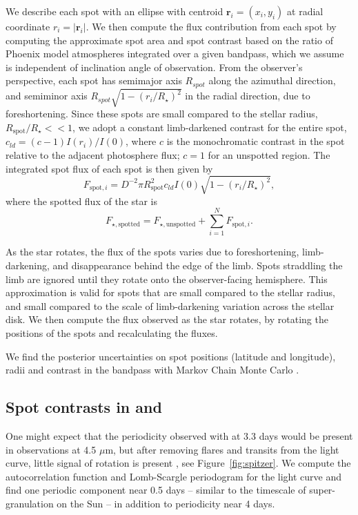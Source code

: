 We describe  each spot with an ellipse with centroid $\mathbf{r}_i = (x_i, y_i)$
at radial coordinate $r_i = \vert \mathbf{r}_i\vert$.  We
then compute the flux contribution from each spot by computing 
the approximate spot area and spot contrast based on the ratio of Phoenix 
model atmospheres integrated over a given bandpass, which we assume is 
independent of inclination angle of observation.  From the observer's 
perspective, each spot has semimajor axis $R_{spot}$ along the azimuthal
direction,  and semiminor axis $R_{spot} \sqrt{1 - (r_i /R_\star)^2}$ in 
the radial direction, due to foreshortening. Since these spots are
small compared to the stellar radius, $R_{\mathrm{spot}}/R_\star <<1$,  
we adopt a constant limb-darkened contrast for the entire spot,
$c_{ld} = (c-1) I(r_i)/I(0)$, where $c$ is the monochromatic contrast 
in the spot relative to the adjacent photosphere flux;  $c=1$ for an
unspotted region. The integrated  spot flux of each spot is then given by
\begin{equation}
F_{\mathrm{spot}, i} = D^{-2} \pi R_{\mathrm{spot}}^2 c_{ld} I(0) \sqrt{1 - (r_i/R_\star)^2}, 
\end{equation}
where the spotted flux of the star is
\begin{equation}
F_{\star, \mathrm{spotted}} = F_{\star, \mathrm{unspotted}}  + \sum_{i=1}^{N} F_{\mathrm{spot}, i}.
\end{equation}

As the star rotates, the flux of the spots varies due to foreshortening,
limb-darkening, and disappearance behind the edge of the limb. Spots
straddling the limb are ignored until they rotate onto the observer-facing 
hemisphere. This approximation is valid 
for spots that are small compared to the stellar radius, and small compared 
to the scale of limb-darkening variation across the stellar disk. We then 
compute the flux observed as the star rotates, by rotating the positions 
of the spots and recalculating the fluxes.

We find the posterior uncertainties on spot positions (latitude and longitude), radii and contrast in the \kepler bandpass with Markov Chain Monte Carlo \citep{Foreman-Mackey2013}. 

\subsection{Spot contrasts in \kepler and \spitzer}

One might expect that the periodicity observed with \kepler at 3.3 days would be present in \spitzer observations at 4.5 $\mu$m, but after removing flares and transits from the \spitzer light curve, little signal of rotation is present \citet{Delrez2018}, see Figure~\ref{fig:spitzer}. We compute the autocorrelation function and Lomb-Scargle periodogram for the \spitzer light curve and find one periodic component near 0.5 days -- similar to the timescale of super-granulation on the Sun \citep{aigrain2003} -- in addition to periodicity near 4 days. 

